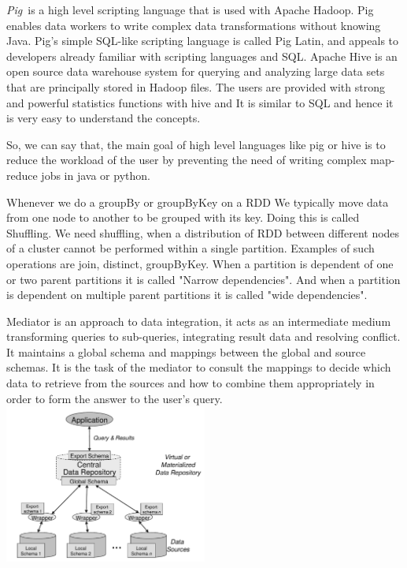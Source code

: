 \begin{exercise}{0}

  \begin{subexercise}
    \emph{Pig} is a high level scripting language that is used with Apache Hadoop. Pig enables data workers to write complex data transformations without knowing Java. Pig’s simple SQL-like scripting language is called Pig Latin, and appeals to developers already familiar with scripting languages and SQL.
    Apache Hive is an open source data warehouse system for querying and analyzing large data sets that are principally stored in Hadoop files. The users are provided with strong and powerful statistics functions with hive and It is similar to SQL and hence it is very easy to understand the concepts.

    So, we can say that, the main goal of high level languages like pig or hive is to reduce the workload of the user by preventing the need of writing complex map-reduce jobs in java or python.
  \end{subexercise}
  
  \begin{subexercise}
    Whenever we do a groupBy or groupByKey on a RDD We typically move data from one node to another to be grouped with its key. Doing this is called Shuffling. We need shuffling, when a distribution of RDD between different nodes of a cluster cannot be performed within a single partition. Examples of such operations are join, distinct, groupByKey. 
    When a partition is dependent of one or two parent partitions it is called "Narrow dependencies". And when a partition is dependent on multiple parent partitions it is called "wide dependencies".
  \end{subexercise}
  
  \begin{subexercise}
    Mediator is an approach to data integration, it acts as an intermediate medium transforming queries to sub-queries, integrating result data and resolving conflict. It maintains a global schema and mappings between the global and source schemas. It is the task of the mediator to consult the mappings to decide which data to retrieve from the sources and how to combine them appropriately in order to form the answer to the user's query. \\
    \centering
    \includegraphics[width=0.5\textwidth]{ueb06/image.png}
  \end{subexercise}
  

\end{exercise}
